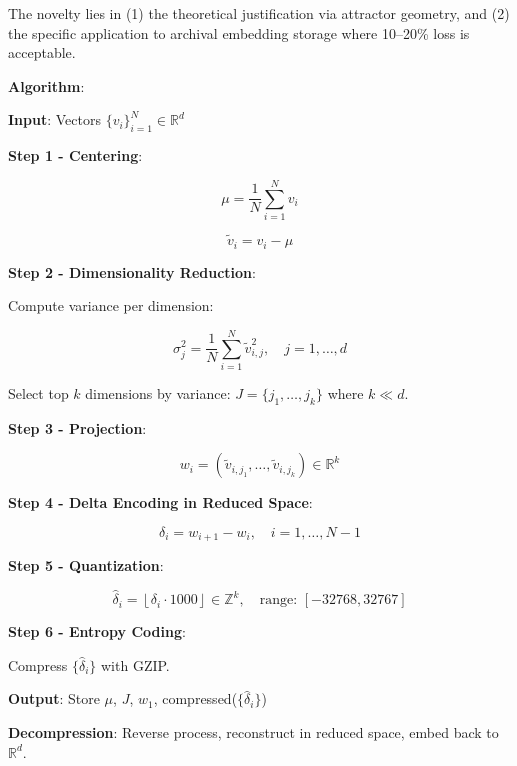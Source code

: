 \documentclass[11pt,a4paper]{article}
\begin{document}
The novelty lies in (1) the theoretical justification via attractor geometry, and (2) the specific application to archival embedding storage where 10--20\% loss is acceptable.

\textbf{Algorithm}:

\textbf{Input}: Vectors $\{v_i\}_{i=1}^N \in \mathbb{R}^d$

\textbf{Step 1 - Centering}:

\begin{equation}
\mu = \frac{1}{N} \sum_{i=1}^N v_i
\end{equation}

\begin{equation}
\tilde{v}_i = v_i - \mu
\end{equation}

\textbf{Step 2 - Dimensionality Reduction}:

Compute variance per dimension:

\begin{equation}
\sigma_j^2 = \frac{1}{N} \sum_{i=1}^N \tilde{v}_{i,j}^2, \quad j = 1, \ldots, d
\end{equation}

Select top $k$ dimensions by variance: $J = \{j_1, \ldots, j_k\}$ where $k \ll d$.

\textbf{Step 3 - Projection}:

\begin{equation}
w_i = (\tilde{v}_{i,j_1}, \ldots, \tilde{v}_{i,j_k}) \in \mathbb{R}^k
\end{equation}

\textbf{Step 4 - Delta Encoding in Reduced Space}:

\begin{equation}
\delta_i = w_{i+1} - w_i, \quad i = 1, \ldots, N-1
\end{equation}

\textbf{Step 5 - Quantization}:

\begin{equation}
\hat{\delta}_i = \left\lfloor \delta_i \cdot 1000 \right\rfloor \in \mathbb{Z}^k, \quad \text{range: } [-32768, 32767]
\end{equation}

\textbf{Step 6 - Entropy Coding}:

Compress $\{\hat{\delta}_i\}$ with GZIP.

\textbf{Output}: Store $\mu$, $J$, $w_1$, compressed($\{\hat{\delta}_i\}$)

\textbf{Decompression}: Reverse process, reconstruct in reduced space, embed back to $\mathbb{R}^d$.
\end{document}
